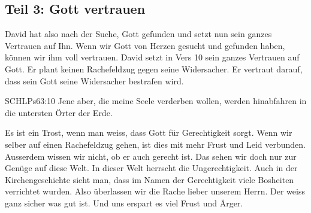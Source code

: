 \documentclass[fontsize=16pt]{mybib}
\begin{document}
    \subsection*{Teil 3: Gott vertrauen}
    \begin{otsblock}
    David hat also nach der Suche, Gott gefunden und setzt nun sein ganzes Vertrauen auf Ihn.
    Wenn wir Gott von Herzen gesucht und gefunden haben, können wir ihm voll vertrauen. David setzt in Vers 10 sein ganzes Vertrauen auf Gott. Er plant keinen Rachefeldzug gegen seine Widersacher. Er vertraut darauf, dass sein Gott seine Widersacher bestrafen wird.
    \begin{bibelbox}{SCHL}{Ps}{63:10}
        Jene aber, die meine Seele verderben wollen, werden hinabfahren in die untersten Örter der Erde.
    \end{bibelbox}
    Es ist ein Trost, wenn man weiss, dass Gott für Gerechtigkeit sorgt. Wenn wir selber auf einen Rachefeldzug gehen, ist dies mit  mehr Frust und Leid verbunden. Ausserdem wissen wir nicht, ob er auch gerecht ist. Das sehen wir doch nur zur Genüge auf diese Welt. In dieser Welt herrscht die Ungerechtigkeit. Auch in der Kirchengeschichte sieht man, dass im Namen der Gerechtigkeit viele Bosheiten verrichtet wurden. Also überlassen wir die Rache lieber unserem Herrn. Der weiss ganz sicher was gut ist. Und uns erspart es viel Frust und Ärger. 
    \end{otsblock}
\end{document}
